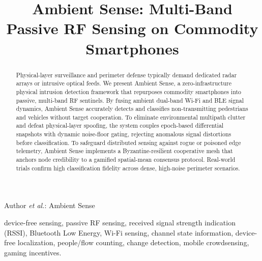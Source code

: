 \documentclass[journal,10pt]{IEEEtran}
\begin{document}
\title{Ambient Sense: Multi-Band Passive RF Sensing on Commodity Smartphones}

\author{%
}

%
{Author \MakeLowercase{\textit{et al.}}: Ambient Sense}

\maketitle

\begin{abstract}
Physical-layer surveillance and perimeter defense typically demand dedicated radar arrays or intrusive optical feeds. We present Ambient Sense, a zero-infrastructure physical intrusion detection framework that repurposes commodity smartphones into passive, multi-band RF sentinels. By fusing ambient dual-band Wi-Fi and BLE signal dynamics, Ambient Sense accurately detects and classifies non-transmitting pedestrians and vehicles without target cooperation. To eliminate environmental multipath clutter and defeat physical-layer spoofing, the system couples epoch-based differential snapshots with dynamic noise-floor gating, rejecting anomalous signal distortions before classification. To safeguard distributed sensing against rogue or poisoned edge telemetry, Ambient Sense implements a Byzantine-resilient cooperative mesh that anchors node credibility to a gamified spatial-mean consensus protocol. Real-world trials confirm high classification fidelity across dense, high-noise perimeter scenarios.
\end{abstract}

\begin{IEEEkeywords}
device-free sensing, passive RF sensing, received signal strength indication
(RSSI), Bluetooth Low Energy, Wi-Fi sensing, channel state information,
device-free localization, people/flow counting, change detection, mobile
crowdsensing, gaming incentives.
\end{IEEEkeywords}
\end{document}
